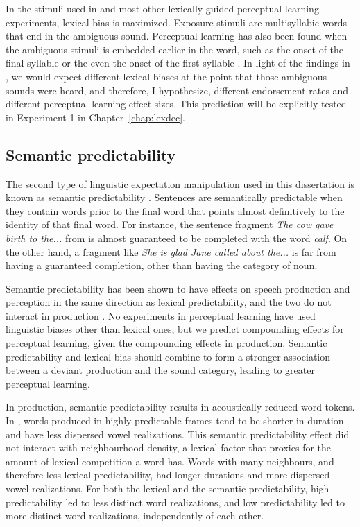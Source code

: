 In the stimuli used in \citet{Norris2003} and most other lexically-guided perceptual learning experiments, lexical bias is maximized.  Exposure stimuli are multisyllabic words that end in the ambiguous sound.  Perceptual learning has also been found when the ambiguous stimuli is embedded earlier in the word, such as the onset of the final syllable \citep{Kraljic2005, Kraljic2008, Kraljic2008a} or the even the onset of the first syllable \citep{Clare2014}.  In light of the findings in \citet{Pitt2012}, we would expect different lexical biases at the point that those ambiguous sounds were heard, and therefore, I hypothesize, different endorsement rates and different perceptual learning effect sizes.  This prediction will be explicitly tested in Experiment 1 in Chapter~\ref{chap:lexdec}.

\subsection{Semantic predictability}
\label{sec:semanticpredictability}

The second type of linguistic expectation manipulation used in this dissertation is known as semantic predictability \citep{Kalikow1977}.
Sentences are semantically predictable when they contain words prior to the final word that points almost definitively to the identity of that final word.  
For instance, the sentence fragment \emph{The cow gave birth to the...} from \citet{Kalikow1977} is almost guaranteed to be completed with the word \emph{calf}.  
On the other hand, a fragment like \emph{She is glad Jane called about the...} is far from having a guaranteed completion, other than having the category of noun.

Semantic predictability has been shown to have effects on speech production and perception in the same direction as lexical predictability, and the two do not interact in production \citep{Scarborough2010}.  No experiments in perceptual learning have used linguistic biases other than lexical ones, but we predict compounding effects for perceptual learning, given the compounding effects in production.  Semantic predictability and lexical bias should combine to form a stronger association between a deviant production and the sound category, leading to greater perceptual learning.

In production, semantic predictability results in acoustically reduced word tokens.  
In \citet{Scarborough2010}, words produced in highly predictable frames tend to be shorter in duration and have less dispersed vowel realizations.  
This semantic predictability effect did not interact with neighbourhood density, a lexical factor that proxies for the amount of lexical competition a word has.  
Words with many neighbours, and therefore less lexical predictability, had longer durations and more dispersed vowel realizations.  
For both the lexical and the semantic predictability, high predictability led to less distinct word realizations, and low predictability led to more distinct word realizations, independently of each other.

